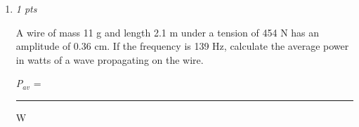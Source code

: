 \documentclass[11pt]{article}
\begin{document}
\begin{enumerate}[leftmargin=*,label=\textbf{Question \arabic*.}]
\textbf{(d) }the phase shift is [Select]
 rad;

\textbf{(e) }the frequency is [Select]
 Hz;

\textbf{(f)} the period is [Select]
 s;

\textbf{(g)} the wavelength is [Select]
 m;

\textbf{(h)} the propagation speed of the wave is [Select]
 m/s;

\textbf{(i)} the transverse \textbf{speed} of the wave at (0,0) is [Select]
 m/s.

\item \hfill \textit{1 pts}

A wire of mass 11 g and length 2.1 m under a tension of 454 N has an amplitude of 0.36 cm. If the frequency is 139 Hz, calculate the average power in watts of a wave propagating on the wire.



\emph{P}$_{av}$ = \rule{2cm}{0.4pt} W

\end{enumerate}
\end{document}

